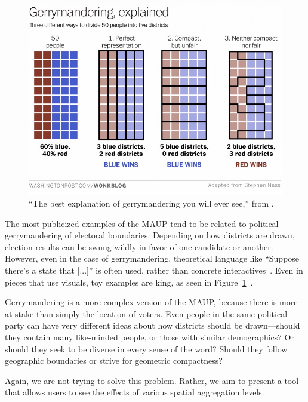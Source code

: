 \documentclass{article}\usepackage[]{graphicx}\usepackage[]{color}
\begin{document}
\begin{figure}[htbp]
\begin{centering}
\includegraphics[width=\textwidth]{../img/gerrymandering}
\caption{``The best explanation of gerrymandering you will ever see,'' from \cite{Ing2015}.}\label{gerrymandering}
\end{centering}
\end{figure}


The most publicized examples of the MAUP tend to be related to political gerrymandering of electoral boundaries. Depending on how districts are drawn, election results can be swung wildly in favor of one candidate or another. However, even in the case of gerrymandering, theoretical language like ``Suppose there's a state that [...]'' is often used, rather than concrete interactives~\citep{Coh2015}. Even in pieces that use visuals, toy examples are king, as seen in Figure~\ref{gerrymandering}~\citep{Ing2015}.


Gerrymandering is a more complex version of the MAUP, because there is more at stake than simply the location of voters. Even people in the same political party can have very different ideas about how districts should be drawn---should they contain many like-minded people, or those with similar demographics? Or should they seek to be diverse in every sense of the word? Should they follow geographic boundaries or strive for geometric compactness? 

Again, we are not trying to solve this problem. Rather, we aim to present a tool that allows users to see the effects of various spatial aggregation levels.
\end{document}
